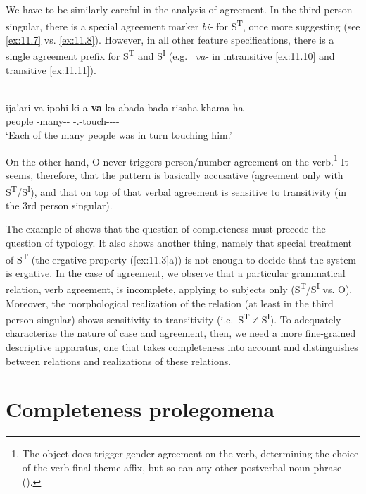 \documentclass[output=paper]{langsci/langscibook}
\begin{document}
We have to be similarly careful in the analysis of  agreement. In the
third person singular, there is a special agreement marker \emph{bi-} for
S\textsuperscript{T}, once more suggesting  (see \eqref{ex:11.7} vs. \eqref{ex:11.8}).
However, in all other feature specifications, there is a single agreement
prefix for S\textsuperscript{T} and S\textsuperscript{I} (e.g.\ \Tpl{}
\emph{va-} in intransitive \eqref{ex:11.10} and transitive \eqref{ex:11.11}).

\ea%
    \label{ex:11.11}  \parencite[281]{ChapmanDerbyshire1991}\\
    \gll ija'ari  va-ipohi-ki-a \textbf{va}-ka-abada-bada-risaha-khama-ha\\
        people  \Tpl{}-many-\Desc-\Erg{} \Tpl-\Tr.\Distr{}-touch-\Red{}-\Iter-\Distr-\Th{}\\
    \glt ‘Each of the many people was in turn touching him.’
\z

On the other hand, O never triggers person/number agreement on the
verb.\footnote{The object does trigger gender agreement on the verb,
determining the choice of the verb-final theme affix, but so can any other
postverbal noun phrase (\citealt[288]{ChapmanDerbyshire1991}).} It seems,
therefore, that the pattern is basically accusative (agreement only with
S\textsuperscript{T}/S\textsuperscript{I}), and that on top of that verbal
agreement is sensitive to transitivity (in the 3rd person singular).

The example of  shows that the question of completeness must precede the
question of  typology. It also shows another thing, namely that
special treatment of S\textsuperscript{T} (the ergative property (\ref{ex:11.3}a)) is not
enough to decide that the system is ergative. In the case of  agreement,
we observe that a particular grammatical relation, verb agreement, is
incomplete, applying to subjects only
(S\textsuperscript{T}/S\textsuperscript{I} vs. O). Moreover, the morphological
realization of the relation (at least in the third person singular) shows
sensitivity to transitivity (i.e.\ S\textsuperscript{T} ≠ S\textsuperscript{I}).
To adequately characterize the nature of  case and agreement, then, we
need a more fine-grained descriptive apparatus, one that takes completeness
into account and distinguishes between relations and realizations of these
relations.

\section{Completeness prolegomena}\label{sec:11.3}
\end{document}
